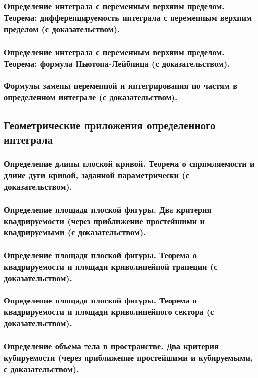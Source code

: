 \documentclass[10pt]{article}
\begin{document}
    \subsubsection{Определение интеграла с переменным верхним пределом. Теорема: дифференцируемость интеграла с переменным верхним пределом (с доказательством).}
    \subsubsection{Определение интеграла с переменным верхним пределом. Теорема: формула Ньютона-Лейбница (с доказательством).}
    \subsubsection{Формулы замены переменной и интегрирования по частям в определенном интеграле (с доказательством).}
    \subsection{Геометрические приложения определенного интеграла}
    \subsubsection{Определение длины плоской кривой. Теорема о спрямляемости и длине дуги кривой, заданной параметрически (с доказательством).}
    \subsubsection{Определение площади плоской фигуры. Два критерия квадрируемости (через приближение простейшими и квадрируемыми (с доказательством).}
    \subsubsection{Определение площади плоской фигуры. Теорема о квадрируемости и площади криволинейной трапеции (с доказательством).}
    \subsubsection{Определение площади плоской фигуры. Теорема о квадрируемости и площади криволинейного сектора (с доказательством).}
    \subsubsection{Определение объема тела в пространстве. Два критерия кубируемости (через приближение простейшими и кубируемыми, с доказательством).}
\end{document}
